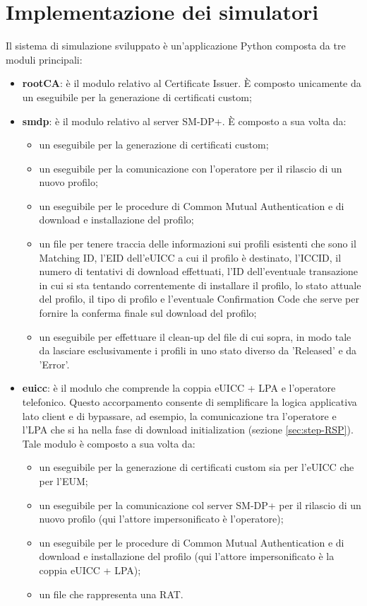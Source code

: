 \documentclass[10pt, oneside]{book}
\begin{document}
\section{Implementazione dei simulatori}
Il sistema di simulazione sviluppato è un'applicazione Python composta da tre moduli principali:
\begin{itemize}
\item \textbf{rootCA}: è il modulo relativo al Certificate Issuer. È composto unicamente da un eseguibile per la generazione di certificati custom;
\item \textbf{smdp}: è il modulo relativo al server SM-DP+. È composto a sua volta da:
\begin{itemize}
\item un eseguibile per la generazione di certificati custom;
\item un eseguibile per la comunicazione con l'operatore per il rilascio di un nuovo profilo;
\item un eseguibile per le procedure di Common Mutual Authentication e di download e installazione del profilo;
\item un file per tenere traccia delle informazioni sui profili esistenti che sono il Matching ID, l'EID dell'eUICC a cui il profilo è destinato, l'ICCID, il numero di tentativi di download effettuati, l'ID dell'eventuale transazione in cui si sta tentando correntemente di installare il profilo, lo stato attuale del profilo, il tipo di profilo e l'eventuale Confirmation Code che serve per fornire la conferma finale sul download del profilo;
\item un eseguibile per effettuare il clean-up del file di cui sopra, in modo tale da lasciare esclusivamente i profili in uno stato diverso da 'Released' e da 'Error'.
\end{itemize}
\item \textbf{euicc}: è il modulo che comprende la coppia eUICC + LPA e l'operatore telefonico. Questo accorpamento consente di semplificare la logica applicativa lato client e di bypassare, ad esempio, la comunicazione tra l'operatore e l'LPA che si ha nella fase di download initialization (sezione \ref{sec:step-RSP}). Tale modulo è composto a sua volta da:
\begin{itemize}
\item un eseguibile per la generazione di certificati custom sia per l'eUICC che per l'EUM;
\item un eseguibile per la comunicazione col server SM-DP+ per il rilascio di un nuovo profilo (qui l'attore impersonificato è l'operatore);
\item un eseguibile per le procedure di Common Mutual Authentication e di download e installazione del profilo (qui l'attore impersonificato è la coppia eUICC + LPA);
\item un file che rappresenta una RAT.
\end{itemize}
\end{itemize}
\end{document}
